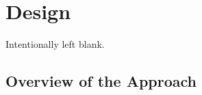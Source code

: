 \chapter{Design}

Intentionally left blank.

\section{Overview of the Approach}
\label{sec:OverviewOfApproach}
